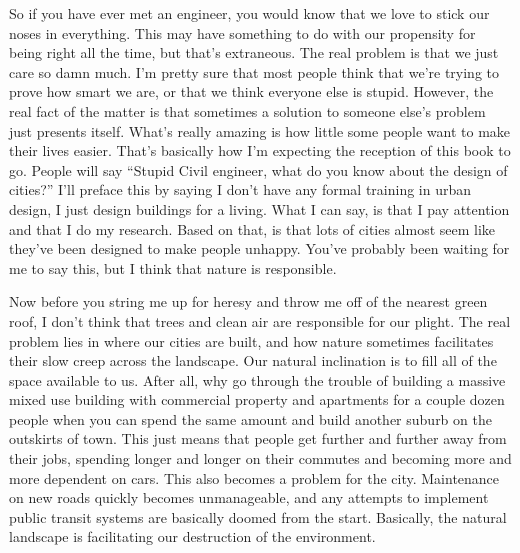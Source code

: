 \documentclass{book}
\begin{document}
    So if you have ever met an engineer, you would know that we love to stick our noses in everything.
    This may have something to do with our propensity for being right all the time, but that's extraneous.
    The real problem is that we just care so damn much.
    I'm pretty sure that most people think that we're trying to prove how smart we are, or that we think everyone else is stupid.
    However, the real fact of the matter is that sometimes a solution to someone else's problem just presents itself.
    What's really amazing is how little some people want to make their lives easier.
    That's basically how I'm expecting the reception of this book to go.
    People will say ``Stupid Civil engineer, what do you know about the design of cities?''
    I'll preface this by saying I don't have any formal training in urban design, I just design buildings for a living.
    What I can say, is that I pay attention and that I do my research.
    Based on that, is that lots of cities almost seem like they've been designed to make people unhappy.
    You've probably been waiting for me to say this, but I think that nature is responsible.

    Now before you string me up for heresy and throw me off of the nearest green roof, I don't think that trees and clean air are responsible for our plight.
    The real problem lies in where our cities are built, and how nature sometimes facilitates their slow creep  across the landscape.
    Our natural inclination is to fill all of the space available to us.
    After all, why go through the trouble of building a massive mixed use building with commercial property and apartments for a couple dozen people when you can spend the same amount and build another suburb on the outskirts of town.
    This just means that people get further and further away from their jobs, spending longer and longer on their commutes and becoming more and more dependent on cars.
    This also becomes a problem for the city.
    Maintenance on new roads quickly becomes unmanageable, and any attempts to implement public transit systems are basically doomed from the start.
    Basically, the natural landscape is facilitating our destruction of the environment. 
\end{document}
